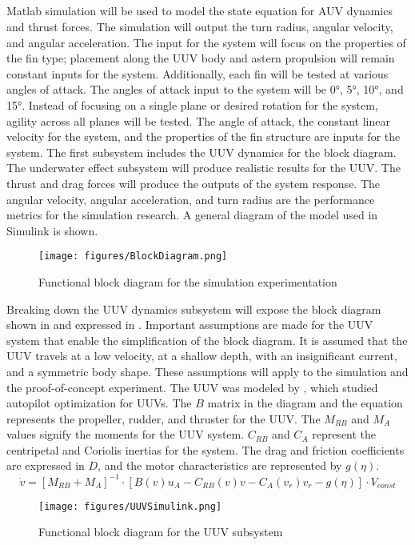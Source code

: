 \documentclass[]{IEEEtran}
\begin{document}
\subsection{}
Matlab simulation will be used to model the state equation for AUV dynamics and thrust forces.  The simulation will output the turn radius, angular velocity, and angular acceleration.  The input for the system will focus on the properties of the fin type; placement along the UUV body and astern propulsion will remain constant inputs for the system.  Additionally, each fin will be tested at various angles of attack.  The angles of attack input to the system will be \ang{0}, \ang{5}, \ang{10}, and \ang{15}.  Instead of focusing on a single plane or desired rotation for the system, agility across all planes will be tested.  The angle of attack, the constant linear velocity for the system, and the properties of the fin structure are inputs for the system.  The first subsystem includes the UUV dynamics for the block diagram.  The underwater effect subsystem will produce realistic results for the UUV.  The thrust and drag forces will produce the outputs of the system response.  The angular velocity, angular acceleration, and turn radius are the performance metrics for the simulation research.  A general diagram of the model used in Simulink is shown. 
\begin{figure*}
\begin{center}
\texttt{[image: figures/BlockDiagram.png]}
\end{center}
\caption{Functional block diagram for the simulation experimentation}
\label{fig:3}
\end{figure*}

Breaking down the UUV dynamics subsystem will expose the block diagram shown in  and expressed in .  Important assumptions are made for the UUV system that enable the simplification of the block diagram.  It is assumed that the UUV travels at a low velocity, at a shallow depth, with an insignificant current, and a symmetric body shape.  These assumptions will apply to the simulation and the proof-of-concept experiment.  The UUV was modeled by \cite{taubert2014model}, which studied autopilot optimization for UUVs.  The $B$ matrix in the diagram and the equation represents the propeller, rudder, and thruster for the UUV.  The $M_{RB}$ and $M_A$ values signify the moments for the UUV system.  $C_{RB}$ and $C_A$ represent the centripetal and Coriolis inertias for the system.  The drag and friction coefficients are expressed in $D$, and the motor characteristics are represented by $g(\eta)$.  
\begin{equation}
\dot{v} = 
\left[ M_{RB} + M_A \right]^{-1} \cdot
\left[ B(v) u_A - C_{RB}(v) v - C_A(v_r)v_r - g(\eta) \right] \cdot
V_{const}
\label{eq:1}
\end{equation}
\begin{figure*}
\begin{center}
\texttt{[image: figures/UUVSimulink.png]}
\end{center}
\caption{Functional block diagram for the UUV subsystem \cite{taubert2014model}}
\label{fig:4}
\end{figure*}
\end{document}
